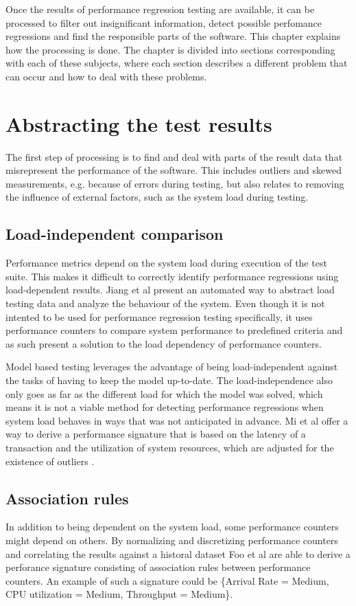 
Once the results of performance regression testing are available, it can be processed to filter out insignificant information, detect possible perfomance regressions and find the responsible parts of the software. This chapter explains how the processing is done. The chapter is divided into sections corresponding with each of these subjects, where each section describes a different problem that can occur and how to deal with these problems.

\section{Abstracting the test results}
The first step of processing is to find and deal with parts of the result data that misrepresent the performance of the software. This includes outliers and skewed measurements, e.g. because of errors during testing, but also relates to removing the influence of external factors, such as the system load during testing. 

\subsection{Load-independent comparison}
Performance metrics depend on the system load during execution of the test suite. This makes it difficult to correctly identify performance regressions using load-dependent results. Jiang et al present an automated way to abstract load testing data and analyze the behaviour of the system. \cite{jiang2010automated} Even though it is not intented to be used for performance regression testing specifically, it uses performance counters to compare system performance to predefined criteria and as such present a solution to the load dependency of performance counters.

Model based testing leverages the advantage of being load-independent against the tasks of having to keep the model up-to-date. The load-independence also only goes as far as the different load for which the model was solved, which means it is not a viable method for detecting performance regressions when system load behaves in ways that was not anticipated in advance. Mi et al offer a way to derive a performance signature that is based on the latency of a transaction and the utilization of system resources, which are adjusted for the existence of outliers \cite{mi2008analysis}.

\subsection{Association rules}
In addition to being dependent on the system load, some performance counters might depend on others. By normalizing and discretizing performance counters and correlating the results against a historal dataset Foo et al are able to derive a perforance signature \cite{foo2010mining} consisting of association rules between performance counters. An example of such a signature could be \{Arrival Rate = Medium, CPU utilization = Medium, Throughput = Medium\}.

